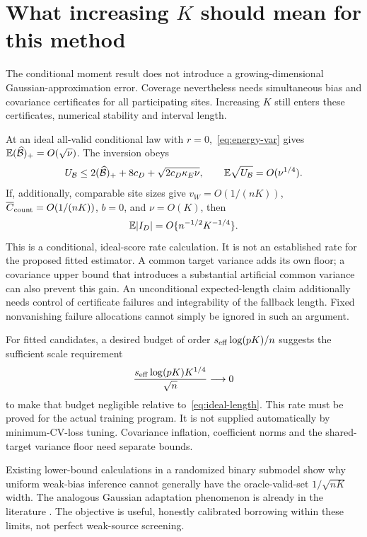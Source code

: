\section{What increasing \texorpdfstring{$K$}{K} should mean for this method}

The conditional moment result does not introduce a growing-dimensional
Gaussian-approximation error. Coverage nevertheless needs simultaneous bias
and covariance certificates for all participating sites. Increasing $K$
still enters these certificates, numerical stability and interval length.

At an ideal all-valid conditional law with $r=0$,~\eqref{eq:energy-var} gives
$\mathbb E(\widehat{\mathcal B})_+=O(\sqrt\nu)$. The inversion obeys
\[
 U_{\mathcal B}\le2(\widehat{\mathcal B})_++8c_D+\sqrt{2c_D\kappa_E\nu},
 \qquad \mathbb E\sqrt{U_{\mathcal B}}=O(\nu^{1/4}).
\]
If, additionally, comparable site sizes give $v_W=O(1/(nK))$,
$\overline C_{\rm count}=O(1/(nK))$, $b=0$, and $\nu=O(K)$, then
\begin{equation}
 \mathbb E|I_D|=O\{n^{-1/2}K^{-1/4}\}.\label{eq:ideal-length}
\end{equation}
This is a conditional, ideal-score rate calculation. It is not an established
rate for the proposed fitted estimator. A common target variance adds its
own floor; a covariance upper bound that introduces a substantial artificial
common variance can also prevent this gain. An unconditional expected-length
claim additionally needs control of certificate failures and integrability
of the fallback length. Fixed nonvanishing failure allocations cannot simply
be ignored in such an argument.

For fitted candidates, a desired budget of order
$s_{\rm eff}\log(pK)/n$ suggests the sufficient scale requirement
\[
 \frac{s_{\rm eff}\log(pK)K^{1/4}}{\sqrt n}\longrightarrow0
\]
to make that budget negligible relative to~\eqref{eq:ideal-length}.
This rate must be proved for the actual training program. It is not supplied
automatically by minimum-CV-loss tuning. Covariance inflation, coefficient
norms and the shared-target variance floor need separate bounds.

Existing lower-bound calculations in a randomized binary submodel show why
uniform weak-bias inference cannot generally have the oracle-valid-set
$1/\sqrt{nK}$ width. The analogous Gaussian adaptation phenomenon is already
in the literature \citep{wang2026}. The objective is useful, honestly calibrated
borrowing within these limits, not perfect weak-source screening.

